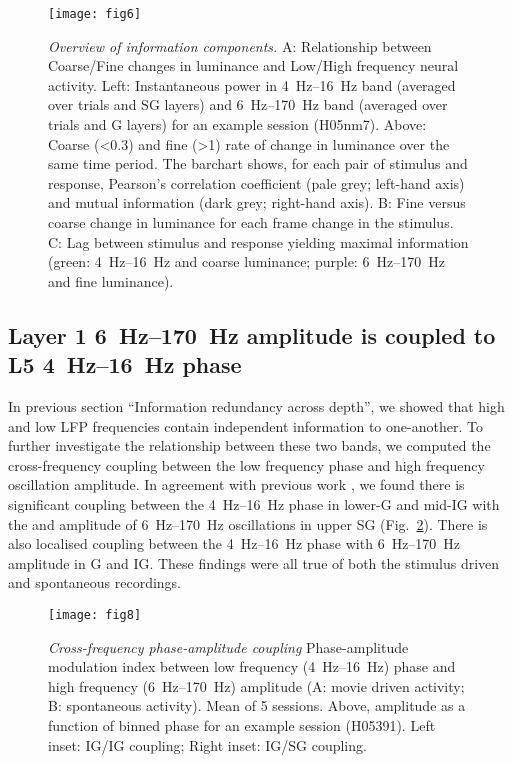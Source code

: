 \begin{figure}[htbp]
\centering \texttt{[image: fig6]}
%
\caption{%
\textit{Overview of information components.}
A: Relationship between Coarse/Fine changes in luminance and Low/High frequency neural activity.
Left: Instantaneous power in \SIrange{4}{16}{Hz} band (averaged over trials and \ac{SG} layers) and \SIrange{6}{170}{Hz} band (averaged over trials and \ac{G} layers) for an example session (H05nm7).
Above: Coarse (\SI{<0.3}{\cpd}) and fine (\SI{>1}{\cpd}) rate of change in luminance over the same time period.
The barchart shows, for each pair of stimulus and response, Pearson's correlation coefficient (pale grey; left-hand axis) and mutual information (dark grey; right-hand axis).
B: Fine versus coarse change in luminance for each frame change in the stimulus.
C: Lag between stimulus and response yielding maximal information (green: \SIrange{4}{16}{Hz} and coarse luminance; purple: \SIrange{6}{170}{Hz} and fine luminance).}%
\label{fig:lam_6}
%
\end{figure}

\subsection{Layer 1 \SIrange{6}{170}{Hz} amplitude is coupled to L5 \SIrange{4}{16}{Hz} phase}
In previous section ``Information redundancy across depth'', we showed that high and low \ac{LFP} frequencies contain independent information to one-another.
To further investigate the relationship between these two bands, we computed the cross-frequency coupling between the low frequency phase and high frequency oscillation amplitude.
In agreement with previous work \citep{Spaak2012}, we found there is significant coupling between the \SIrange{4}{16}{Hz} phase in lower-\ac{G} and mid-\ac{IG} with the and amplitude of \SIrange{6}{170}{Hz} oscillations in upper \ac{SG} (Fig.~\ref{fig:lam_8}).
There is also localised coupling between the \SIrange{4}{16}{Hz} phase with \SIrange{6}{170}{Hz} amplitude in \ac{G} and \ac{IG}.
These findings were all true of both the stimulus driven and spontaneous recordings.

\begin{figure}[htbp]
\centering \texttt{[image: fig8]}
%
\caption{%
\textit{Cross-frequency phase-amplitude coupling}
Phase-amplitude modulation index between low frequency (\SIrange{4}{16}{Hz}) phase and high 
frequency (\SIrange{6}{170}{Hz}) amplitude (A: movie driven activity; B: spontaneous 
activity).
Mean of 5 sessions.
Above, amplitude as a function of binned phase for an example session (H05391).
Left inset: \ac{IG}/\ac{IG} coupling; Right inset: \ac{IG}/\ac{SG} coupling.}%
\label{fig:lam_8}
%
\end{figure}

